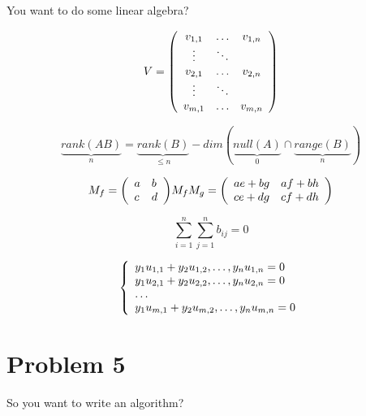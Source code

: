 \documentclass[12pt,letterpaper]{article}
\begin{document}
You want to do some linear algebra?

$$V = \left(\begin{array}{c c c}
v_{1,1} & \ldots & v_{1,n}\\
\vdots & \ddots\\
v_{2,1} & \ldots & v_{2,n}\\
\vdots & \ddots\\
v_{m,1} & \ldots & v_{m,n}\\
\end{array}
\right)$$

$$\underbrace{rank(AB)}_n 
= \underbrace{rank(B)}_{\leq n}
-dim(\underbrace{null(A)}_0\cap \underbrace{range(B)}_n)$$

\begin{equation}
M_f = \left(\begin{array}{l l l}
a & b\\
c & d\\
\end{array}
\right) $$

$$M_f M_g = \left(\begin{array}{l l l}
ae+bg & af+bh\\
ce+dg & cf+dh\\
\end{array}
\right)
\end{equation}


$$\displaystyle\sum_{i=1}^n \displaystyle\sum_{j=1}^n b_{ij} = 0$$


$$\left\{\begin{array}{l l l}
y_1u_{1,1} + y_2u_{1,2},\ldots,y_n u_{1,n} = 0\\
y_1u_{2,1} + y_2u_{2,2},\ldots,y_n u_{2,n} = 0\\
\ldots \\
y_1u_{m,1} + y_2u_{m,2},\ldots,y_n u_{m,n}  = 0\\
\end{array}
\right. $$

\newpage
\section*{Problem 5}

So you want to write an algorithm?
\end{document}
